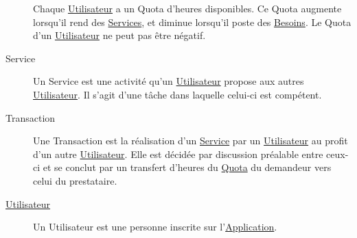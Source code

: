 \documentclass[french,12pt]{article}
\begin{document}
\begin{description}
				Chaque \hyperlink{utilisateur}{Utilisateur} a un Quota d’heures
				 disponibles. Ce Quota augmente lorsqu’il rend des
				 \hyperlink{service}{Services}, et diminue lorsqu’il poste des
				 \hyperlink{besoin}{Besoins}. Le Quota d’un
				 \hyperlink{utilisateur}{Utilisateur} ne peut pas être négatif.
			\item[\hypertarget{service}{Service}]
				Un Service est une activité qu’un \hyperlink{utilisateur}{Utilisateur}
				 propose aux autres \hyperlink{utilisateur}{Utilisateur}. Il s’agit
				 d’une tâche dans laquelle celui-ci est compétent.
			\item[\hypertarget{transaction}{Transaction}]
				Une Transaction est la réalisation d’un \hyperlink{service}{Service} par
				 un \hyperlink{utilisateur}{Utilisateur} au profit d’un autre
				 \hyperlink{utilisateur}{Utilisateur}. Elle est décidée par discussion
				 préalable entre ceux-ci et se conclut par un transfert
				 d’heures du \hyperlink{quota}{Quota} du demandeur vers celui du
				 prestataire.
			\item[\hypertarget{utilisateur}{\hyperlink{utilisateur}{Utilisateur}}]
				Un Utilisateur est une personne inscrite sur
				 l’\hyperlink{application}{Application}.
		\end{description}
		
\end{document}
